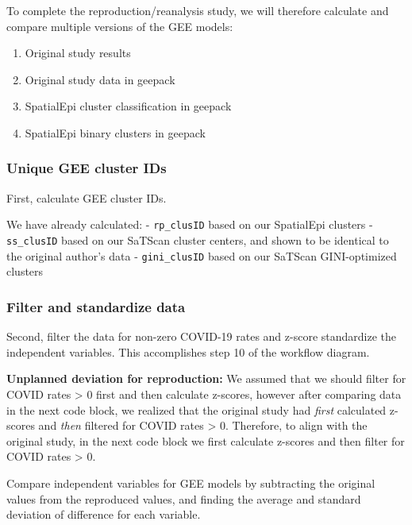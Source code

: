 \documentclass[
]{article}
\providecommand{\tightlist}{%
  \setlength{\itemsep}{0pt}\setlength{\parskip}{0pt}}
\begin{document}
To complete the reproduction/reanalysis study, we will therefore
calculate and compare multiple versions of the GEE models:

\begin{enumerate}
\def\labelenumi{\arabic{enumi}.}
\tightlist
\item
  Original study results
\item
  Original study data in geepack
\item
  SpatialEpi cluster classification in geepack
\item
  SpatialEpi binary clusters in geepack
\end{enumerate}

\hypertarget{unique-gee-cluster-ids}{%
\subsubsection{Unique GEE cluster IDs}\label{unique-gee-cluster-ids}}

First, calculate GEE cluster IDs.

We have already calculated: - \texttt{rp\_clusID} based on our
SpatialEpi clusters - \texttt{ss\_clusID} based on our SaTScan cluster
centers, and shown to be identical to the original author's data -
\texttt{gini\_clusID} based on our SaTScan GINI-optimized clusters

\hypertarget{filter-and-standardize-data}{%
\subsubsection{Filter and standardize
data}\label{filter-and-standardize-data}}

Second, filter the data for non-zero COVID-19 rates and z-score
standardize the independent variables. This accomplishes step 10 of the
workflow diagram.

\textbf{Unplanned deviation for reproduction:} We assumed that we should
filter for COVID rates \textgreater{} 0 first and then calculate
z-scores, however after comparing data in the next code block, we
realized that the original study had \emph{first} calculated z-scores
and \emph{then} filtered for COVID rates \textgreater{} 0. Therefore, to
align with the original study, in the next code block we first calculate
z-scores and then filter for COVID rates \textgreater{} 0.

Compare independent variables for GEE models by subtracting the original
values from the reproduced values, and finding the average and standard
deviation of difference for each variable.
\end{document}
